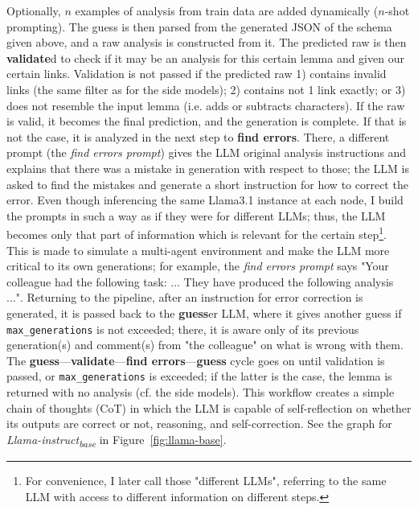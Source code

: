 \documentclass[11pt]{article}
\begin{document}
Optionally, $n$ examples of analysis from train data are added dynamically ($n$-shot prompting). The guess is then parsed from the generated JSON of the schema given above, and a raw analysis is constructed from it. The predicted raw is then \textbf{validate}d to check if it may be an analysis for this certain lemma and given our certain links. Validation is not passed if the predicted raw 1) contains invalid links (the same filter as for the side models); 2) contains not 1 link exactly; or 3) does not resemble the input lemma (i.e. adds or subtracts characters). If the raw is valid, it becomes the final prediction, and the generation is complete. If that is not the case, it is analyzed in the next step to \textbf{find errors}. There, a different prompt (the \textit{find errors prompt}) gives the LLM original analysis instructions and explains that there was a mistake in generation with respect to those; the LLM is asked to find the mistakes and generate a short instruction for how to correct the error. Even though inferencing the same Llama3.1 instance at each node, I build the prompts in such a way as if they were for different LLMs; thus, the LLM becomes only that part of information which is relevant for the certain step\footnote{For convenience, I later call those "different LLMs", referring to the same LLM with access to different information on different steps.}. This is made to simulate a multi-agent environment and make the LLM more critical to its own generations; for example, the \textit{find errors prompt} says "Your colleague had the following task: ... They have produced the following analysis ...". Returning to the pipeline, after an instruction for error correction is generated, it is passed back to the \textbf{guess}er LLM, where it gives another guess if \texttt{max\_generations} is not exceeded; there, it is aware only of its previous generation(s) and comment(s) from "the colleague" on what is wrong with them. The \textbf{guess}---\textbf{validate}---\textbf{find errors}---\textbf{guess} cycle goes on until validation is passed, or \texttt{max\_generations} is exceeded; if the latter is the case, the lemma is returned with no analysis (cf. the side models). This workflow creates a simple chain of thoughts (CoT) in which the LLM is capable of self-reflection on whether its outputs are correct or not, reasoning, and self-correction. See the graph for \textit{Llama-instruct\textsubscript{base}} in Figure~\ref{fig:llama-base}.
\end{document}
